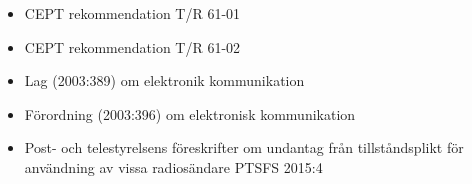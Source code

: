 \begin{itemize}
\item CEPT rekommendation T/R 61-01 \cite{TR6101}
\item CEPT rekommendation T/R 61-02 \cite{TR6102}
\item Lag (2003:389) om elektronik kommunikation \cite{SFS2003:389}
\item Förordning (2003:396) om elektronisk kommunikation \cite{SFS2003:396}
\item Post- och telestyrelsens föreskrifter om undantag från tillståndsplikt för
användning av vissa radiosändare PTSFS 2015:4 \cite{PTSFS2015:4}
\end{itemize}
